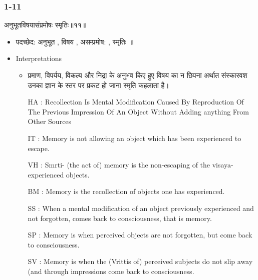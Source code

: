 \begin{frame}[fragile]\frametitle{1-11}
\begin{sanskrit}
अनुभूतविषयासंप्रमोषः स्मृतिः॥११॥
\end{sanskrit}

	\begin{itemize}
	\item पदच्छेद: अनुभूत , विषय , असम्प्रमोष: , स्मृतिः ॥
	\item Interpretations
		\begin{itemize}	
		\item प्रमाण, विपर्यय, विकल्प और निद्रा के अनुभव किए हुए विषय का न छिपना अर्थात संस्कारवश उनका ज्ञान के स्तर पर प्रकट हो जाना स्मृति कहलाता है।
		\item [HA]: Recollection Is Mental Modification Caused By Reproduction Of The Previous Impression Of An Object Without Adding anything From Other Sources
		\item [IT]: Memory is not allowing an object which has been experienced to escape.
		\item [VH]: Smrti- (the act of) memory is the non-escaping of the visaya-experienced objects.
		\item [BM]: Memory is the recollection of objects one has experienced.
		\item [SS]: When a mental modification of an object previously experienced and not forgotten, comes back to consciousness, that is memory.
		\item [SP]: Memory is when perceived objects are not forgotten, but come back to consciousness.
		\item [SV]: Memory is when the (Vrittis of) perceived subjects do not slip away (and through impressions come back to consciousness. 
		\end{itemize}
	\end{itemize}
	
\end{frame}


